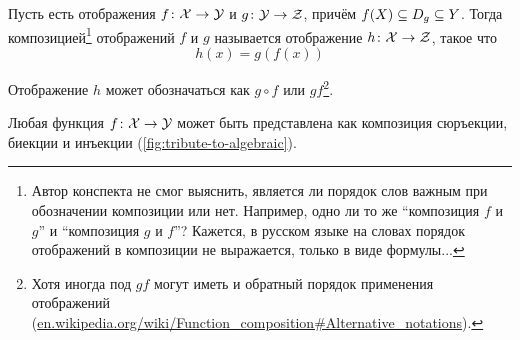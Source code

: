 \documentclass[a4paper,12pt]{article}
\begin{document}
  \begin{definition}
    Пусть есть отображения $f\colon \mathcal X \hm\to \mathcal Y$ и $g\colon \mathcal Y \hm\to \mathcal Z$, причём $f(X) \hm\subseteq D_g \hm\subseteq Y$.
    Тогда композицией\footnote{Автор конспекта не смог выяснить, является ли порядок слов важным при обозначении композиции или нет. Например, одно ли то же ``композиция $f$ и $g$'' и ``композиция $g$ и $f$''? Кажется, в русском языке на словах порядок отображений в композиции не выражается, только в виде формулы...} отображений $f$ и $g$ называется отображение $h\colon \mathcal X \hm\to \mathcal Z$, такое что
    \[
      h(x) = g(f(x))
    \]
    
    Отображение $h$ может обозначаться как $g\circ f$ или $gf$\footnote{Хотя иногда под $gf$ могут иметь и обратный порядок применения отображений (\href{https://en.wikipedia.org/wiki/Function\_composition\#Alternative\_notations}{en.wikipedia.org/wiki/Function\_composition\#Alternative\_notations}).}.
  \end{definition}

  \begin{theorem}
    Любая функция $f\colon \mathcal X \hm\to \mathcal Y$ может быть представлена как композиция сюръекции, биекции и инъекции (\ref{fig:tribute-to-algebraic}).
  \end{theorem}
  
\end{document}
